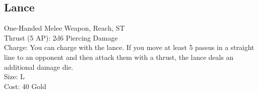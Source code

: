 \subsection{Lance}\label{weapon:lance}
One-Handed Melee Weapon,  Reach, ST\\
Thrust (5 AP): 2d6 Piercing Damage\\
Charge: You can charge with the lance.
If you move at least 5 passus in a straight line to an opponent and then attack them with a thrust, the lance deals an additional damage die.\\
Size: L\\
Cost: 40 Gold\\